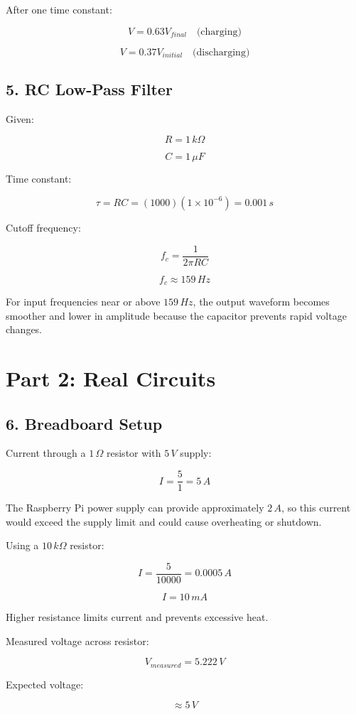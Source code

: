 \documentclass[11pt]{article}
\begin{document}
After one time constant:

\[
V = 0.63V_{final} \quad \text{(charging)}
\]

\[
V = 0.37V_{initial} \quad \text{(discharging)}
\]

\subsection*{5. RC Low-Pass Filter}

Given:

\[
R = 1\,k\Omega
\]

\[
C = 1\,\mu F
\]

Time constant:

\[
\tau = RC = (1000)(1\times10^{-6}) = 0.001\,s
\]

Cutoff frequency:

\[
f_c = \frac{1}{2\pi RC}
\]

\[
f_c \approx 159\,Hz
\]

For input frequencies near or above $159\,Hz$, the output waveform becomes smoother and lower in amplitude because the capacitor prevents rapid voltage changes.

\section*{Part 2: Real Circuits}

\subsection*{6. Breadboard Setup}

Current through a $1\,\Omega$ resistor with $5\,V$ supply:

\[
I = \frac{5}{1} = 5\,A
\]

The Raspberry Pi power supply can provide approximately $2\,A$, so this current would exceed the supply limit and could cause overheating or shutdown.

Using a $10\,k\Omega$ resistor:

\[
I = \frac{5}{10000} = 0.0005\,A
\]

\[
I = 10\,mA
\]

Higher resistance limits current and prevents excessive heat.

Measured voltage across resistor:

\[
V_{measured} = 5.222\,V
\]

Expected voltage:

\[
\approx 5\,V
\]
\end{document}
